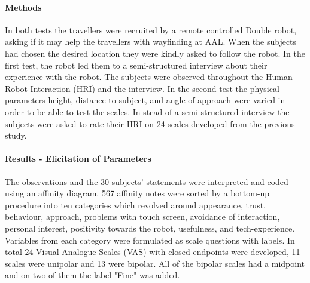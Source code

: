 \documentclass[a4paper]{article}
\begin{document}
\paragraph{Methods}
%
In both tests the travellers were recruited by a remote controlled Double robot, asking if it may help the travellers with wayfinding at AAL. When the subjects had chosen the desired location they were kindly asked to follow the robot. In the first test, the robot led them to a semi-structured interview about their experience with the robot. The subjects were observed throughout the Human-Robot Interaction (HRI) and the interview. In the second test the physical parameters height, distance to subject, and angle of approach were varied in order to be able to test the scales.
In stead of a semi-structured interview the subjects were asked to rate their HRI on 24 scales developed from the previous study.

\paragraph{Results - Elicitation of Parameters}
The observations and the 30 subjects' statements were interpreted and coded using an affinity diagram. 567 affinity notes were sorted by a bottom-up procedure into ten categories which revolved around appearance, trust, behaviour, approach, problems with touch screen, avoidance of interaction, personal interest, positivity towards the robot, usefulness, and tech-experience. Variables from each category were formulated as scale questions with labels. In total 24 Visual Analogue Scales (VAS) with closed endpoints were developed, 11 scales were unipolar and 13 were bipolar. All of the bipolar scales had a midpoint and on two of them the label "Fine" was added.  
\end{document}
